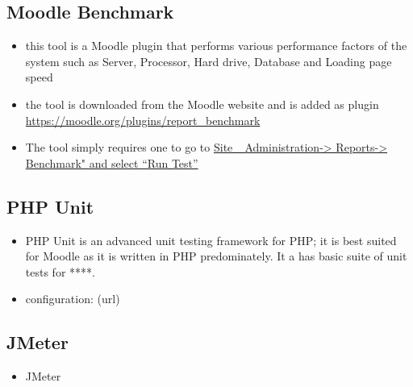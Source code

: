 \documentclass[12pt,a4paper]{article}
\begin{document}
		\subsection*{Moodle Benchmark} 
		\begin{itemize}
			\item this tool is a Moodle plugin that performs various performance factors of the system such as Server, Processor, Hard drive, Database and Loading page speed
			\item the tool is downloaded from the Moodle website and is added as plugin \url{https://moodle.org/plugins/report_benchmark}
			\item The tool simply requires one to go to \url{Site_ Administration-> Reports-> Benchmark" and select “Run Test”}
		\end{itemize}
		
		\subsection{PHP Unit}
			\begin{itemize}
				\item PHP Unit is an advanced unit testing framework for PHP; it is best suited for Moodle as it is written in PHP predominately. It a has basic suite of unit tests for ****.
				\item configuration: (url)
			\end{itemize}
		\subsection{JMeter}
			\begin{itemize}
				\item JMeter
			\end{itemize}
	
				
		
\end{document}
